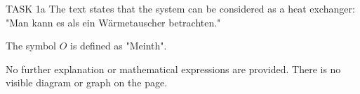 TASK 1a  
The text states that the system can be considered as a heat exchanger:  
"Man kann es als ein Wärmetauscher betrachten."  

The symbol \( O \) is defined as "Meinth".  

No further explanation or mathematical expressions are provided. There is no visible diagram or graph on the page.